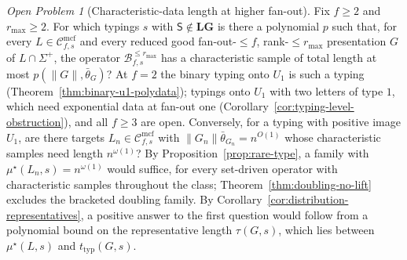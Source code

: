 \documentclass[11pt]{article}
\numberwithin{equation}{section}
\theoremstyle{plain}
\theoremstyle{definition}
\theoremstyle{remark}
\newtheorem{openproblem}[theorem]{Open Problem}
\newcommand{\Cmcf}[2]{\mathcal{C}^{\mathrm{mcf}}_{#1,#2}}
\begin{document}
\begin{openproblem}[Characteristic-data length at higher fan-out]
\label{op:fanout-two}
Fix $f\ge2$ and $r_{\max}\ge2$.  For which typings $s$ with
$\mathsf S\notin\mathbf{LG}$ is there a polynomial $p$ such that, for every
$L\in\Cmcf{f}{s}$ and every reduced good fan-out-$\le f$, rank-$\le r_{\max}$
presentation $G$ of $L\cap\Sigma^+$, the operator
$\mathcal B^{\le r_{\max}}_{f,s}$ has a characteristic sample of total length
at most $p(\|G\|,\bar\theta_G)$?  At $f=2$ the binary typing onto $U_1$ is
such a typing (Theorem~\ref{thm:binary-u1-polydata}); typings onto $U_1$ with
two letters of type $1$, which need exponential data at fan-out one
(Corollary~\ref{cor:typing-level-obstruction}), and all $f\ge3$ are open.  Conversely, for a typing with positive image
$U_1$, are there targets $L_n\in\Cmcf{f}{s}$ with
$\|G_n\|\bar\theta_{G_n}=n^{O(1)}$ whose characteristic samples need length
$n^{\omega(1)}$?  By Proposition~\ref{prop:rare-type}, a family with
$\mu^\star(L_n,s)=n^{\omega(1)}$ would suffice, for every set-driven operator with
characteristic samples throughout the class;
Theorem~\ref{thm:doubling-no-lift} excludes the bracketed doubling family.
By Corollary~\ref{cor:distribution-representatives}, a positive answer to
the first question would follow from a polynomial bound on the
representative length $\tau(G,s)$, which lies between $\mu^\star(L,s)$ and
$t_{\mathrm{typ}}(G,s)$.
\end{openproblem}
\end{document}
